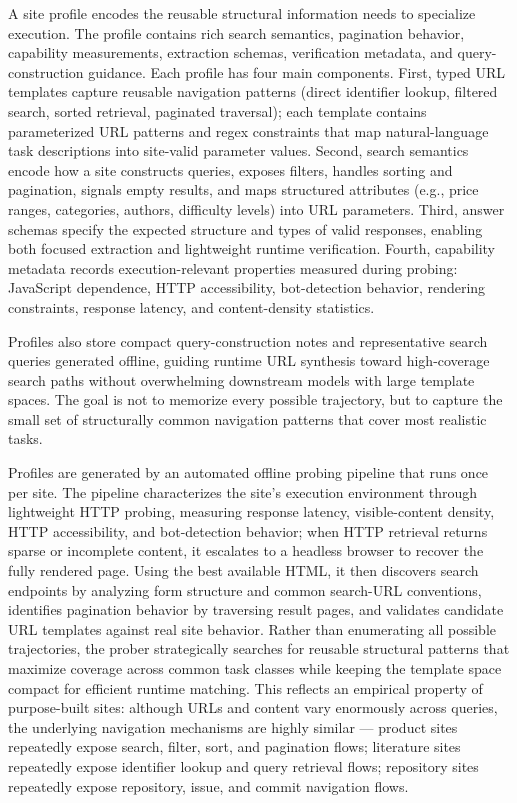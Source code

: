A site profile encodes the reusable structural information \sys{} needs to specialize execution. %
The profile contains rich search semantics, pagination behavior, capability measurements, extraction schemas, verification metadata, and query-construction guidance. Each profile has four main components. First, typed URL templates capture reusable navigation patterns (direct identifier lookup, filtered search, sorted retrieval, paginated traversal); each template contains parameterized URL patterns and regex constraints that map natural-language task descriptions into site-valid parameter values. Second, search semantics encode how a site constructs queries, exposes filters, handles sorting and pagination, signals empty results, and maps structured attributes (e.g., price ranges, categories, authors, difficulty levels) into URL parameters. Third, answer schemas specify the expected structure and types of valid responses, enabling both focused extraction and lightweight runtime verification. Fourth, capability metadata records execution-relevant properties measured during probing: JavaScript dependence, HTTP accessibility, bot-detection behavior, rendering constraints, response latency, and content-density statistics.

Profiles also store compact query-construction notes and representative search queries generated offline, guiding runtime URL synthesis toward high-coverage search paths without overwhelming downstream models with large template spaces. The goal is not to memorize every possible trajectory, but to capture the small set of structurally common navigation patterns that cover most realistic tasks.

Profiles are generated by an automated offline probing pipeline that runs once per site. The pipeline characterizes the site's execution environment through lightweight HTTP probing, measuring response latency, visible-content density, HTTP accessibility, and bot-detection behavior; when HTTP retrieval returns sparse or incomplete content, it escalates to a headless browser to recover the fully rendered page. Using the best available HTML, it then discovers search endpoints by analyzing form structure and common search-URL conventions, identifies pagination behavior by traversing result pages, and validates candidate URL templates against real site behavior. Rather than enumerating all possible trajectories, the prober strategically searches for reusable structural patterns that maximize coverage across common task classes while keeping the template space compact for efficient runtime matching. This reflects an empirical property of purpose-built sites: although URLs and content vary enormously across queries, the underlying navigation mechanisms are highly similar — product sites repeatedly expose search, filter, sort, and pagination flows; literature sites repeatedly expose identifier lookup and query retrieval flows; repository sites repeatedly expose repository, issue, and commit navigation flows.

